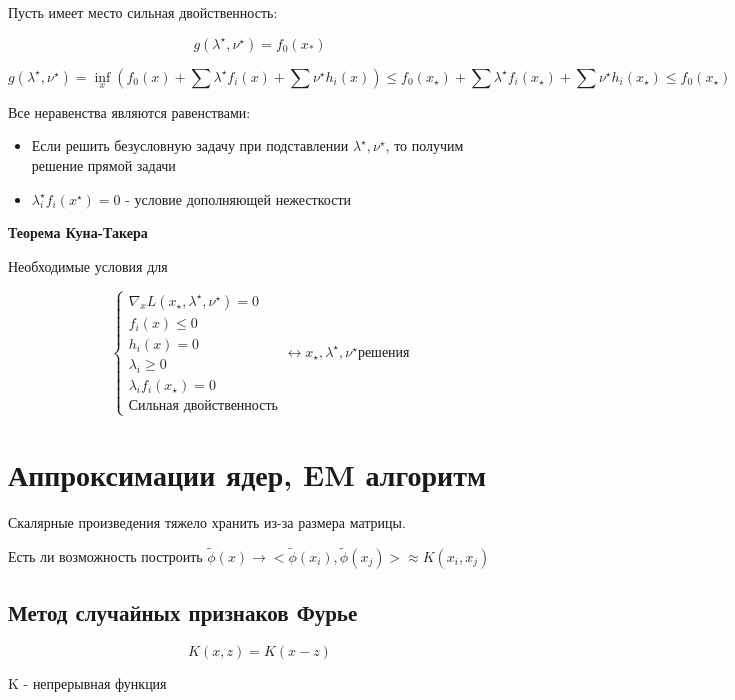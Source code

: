 \documentclass[a4paper, 12pt]{article}
\begin{document}
Пусть имеет место сильная двойственность:

\[g(\lambda^{\star}, \nu^{\star}) = f_0(x_{*})\]

\[g(\lambda^{\star}, \nu^{\star}) = \inf_x(f_0(x) + 
\sum \lambda^{\star} f_i(x) + \sum \nu^{\star} h_i(x))
\leq f_0(x_{\star}) + 
\sum \lambda^{\star} f_i(x_{\star}) + \sum \nu^{\star} h_i(x_{\star}) 
\leq f_0(x_{\star})\]

Все неравенства являются равенствами:

\begin{itemize}
    \item Если решить безусловную задачу при подставлении $\lambda^{\star}, \nu^{\star}$,
    то получим решение прямой задачи
    \item \(\lambda_i^{\star}f_{i}(x^{\star}) = 0\) - условие дополняющей нежесткости
\end{itemize}

\textbf{Теорема Куна-Такера}

Необходимые условия для 

\[
\begin{cases}
    \nabla_x L(x_{\star}, \lambda^{\star}, \nu^{\star}) = 0 \\
    f_i(x) \leq 0 \\
    h_i(x) = 0 \\
    \lambda_i \geq 0 \\
    \lambda_i f_i(x_{\star}) = 0 \\
    \textrm{Сильная двойственность}
\end{cases}
\leftrightarrow x_{\star}, \lambda^{\star}, \nu^{\star} \textrm{решения}
\]

\section{Аппроксимации ядер, EM алгоритм}

Скалярные произведения тяжело хранить из-за
размера матрицы. 

Есть ли возможность построить 
$\tilde{\phi}(x) \rightarrow 
<\tilde{\phi}(x_i), \tilde{\phi}(x_j)> 
\approx K(x_i, x_j)$

\subsection{Метод случайных признаков Фурье}

\[K(x, z) = K(x - z)\]

K - непрерывная функция
\end{document}
